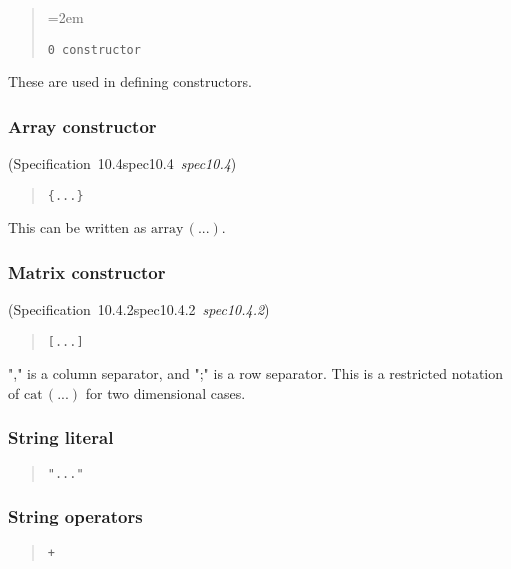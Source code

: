 \documentclass[10pt,b5paper]{article}
\def\specrefx#1#2{Specification~#1\ifx\relax#2\relax{}\else~{\it{}#2}\fi}
\def\specref#1{\specrefx{#1}{\csname spec#1\endcsname}}
\begin{document}
\begin{quote}
\spaceskip=2em
\begin{verbatim}
0 constructor
\end{verbatim}
\end{quote}

\noindent These are used in defining constructors.

\subsubsection*{Array constructor}
(\specref{10.4}\/)

\begin{quote}
\begin{verbatim}
{...}
\end{verbatim}
\end{quote}

\noindent This can be written as $\mathrm{array}\,(...)$.

\subsubsection*{Matrix constructor}
(\specref{10.4.2}\/)

\begin{quote}
\begin{verbatim}
[...]
\end{verbatim}
\end{quote}

\noindent "," is a column separator, and ";" is a row separator.  This
is a restricted notation of $\mathrm{cat}\,(...)$ for two dimensional
cases.

\subsubsection*{String literal}

\begin{quote}
\begin{verbatim}
"..."
\end{verbatim}
\end{quote}

\subsubsection*{String operators}

\begin{quote}
\begin{verbatim}
+
\end{verbatim}
\end{quote}
\end{document}
